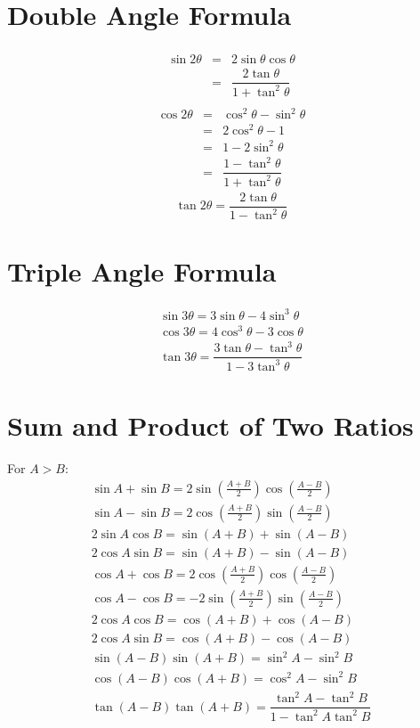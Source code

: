 \documentclass[openany, oneside]{book}
\begin{document}
\section{Double Angle Formula}
\begin{equation}
\begin{aligned}
\begin{split}
\sin 2\theta &=& 2\sin \theta \cos \theta\\
 &=&\dfrac{2 \tan \theta}{1+\tan^2 \theta}
\end{split}
\end{aligned}
\end{equation}
\begin{equation}
\begin{aligned}
\begin{split}
\cos 2\theta &=& \cos^2 \theta -\sin^2 \theta\\
 &=&2\cos^2 \theta-1\\
 &=&1-2\sin^2 \theta\\
 &=&\dfrac{1-\tan^2 \theta}{1+\tan^2 \theta}
\end{split}
\end{aligned}
\end{equation}
\begin{equation}
\tan 2\theta=\dfrac{2 \tan \theta}{1-\tan^2 \theta}
\end{equation}

\section{Triple Angle Formula}
\begin{align}
\sin 3\theta=3\sin \theta-4 \sin^3 \theta\\
\cos 3\theta=4\cos^3 \theta-3 \cos \theta\\
\tan 3\theta=\dfrac{3\tan \theta -\tan^3 \theta}{1-3\tan^3 \theta}
\end{align}

\section{Sum and Product of Two Ratios}
For $A>B$:
\begin{align}
\sin A+\sin B=2 \sin \left(\frac{A+B}{2}\right)\cos \left(\frac{A-B}{2}\right)\\
\sin A-\sin B=2 \cos \left(\frac{A+B}{2}\right)\sin \left(\frac{A-B}{2}\right)\\
2\sin A\cos B=\sin(A+B)+\sin(A-B)\\
2\cos A\sin B=\sin(A+B)-\sin(A-B)\\
\cos A+\cos B=2 \cos \left(\frac{A+B}{2}\right)\cos \left(\frac{A-B}{2}\right)\\
\cos A-\cos B=-2 \sin \left(\frac{A+B}{2}\right)\sin \left(\frac{A-B}{2}\right)\\
2 \cos A\cos B=\cos (A+B)+\cos (A-B)\\
2 \cos A\sin B=\cos (A+B)-\cos (A-B)\\
\sin (A-B)\sin(A+B)=\sin^2 A-\sin^2 B\\
\cos (A-B)\cos(A+B)=\cos^2 A-\sin^2 B\\
\tan (A-B)\tan(A+B)=\dfrac{\tan^2 A-\tan^2 B}{1-\tan^2 A\tan^2 B}
\end{align}
\end{document}
